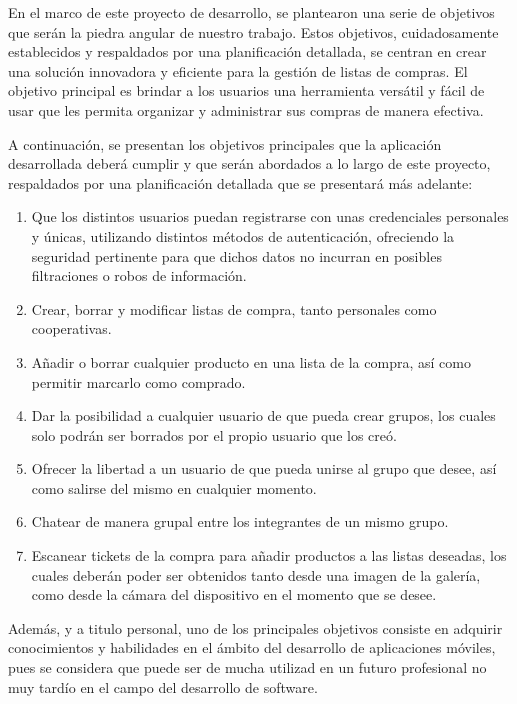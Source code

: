 \documentclass{article}
\begin{document}
En el marco de este proyecto de desarrollo, se plantearon una serie de objetivos que serán la piedra angular de nuestro trabajo. Estos objetivos, cuidadosamente establecidos y respaldados por una planificación detallada, se centran en crear una solución innovadora y eficiente para la gestión de listas de compras. El objetivo principal es brindar a los usuarios una herramienta versátil y fácil de usar que les permita organizar y administrar sus compras de manera efectiva.

A continuación, se presentan los objetivos principales que la aplicación desarrollada deberá cumplir y que serán abordados a lo largo de este proyecto, respaldados por una planificación detallada que se presentará más adelante:

\begin{enumerate}
    \item Que los distintos usuarios puedan registrarse con unas credenciales personales y únicas, utilizando distintos métodos de autenticación, ofreciendo la seguridad pertinente para que dichos datos no incurran en posibles filtraciones o robos de información.
    \item Crear, borrar y modificar listas de compra, tanto personales como cooperativas.
    \item Añadir o borrar cualquier producto en una lista de la compra, así como permitir marcarlo como comprado.
    \item Dar la posibilidad a cualquier usuario de que pueda crear grupos, los cuales solo podrán ser borrados por el propio usuario que los creó.
    \item Ofrecer la libertad a un usuario de que pueda unirse al grupo que desee, así como salirse del mismo en cualquier momento.
    \item Chatear de manera grupal entre los integrantes de un mismo grupo.
    \item Escanear tickets de la compra para añadir productos a las listas deseadas, los cuales deberán poder ser obtenidos tanto desde una imagen de la galería, como desde la cámara del dispositivo en el momento que se desee.
\end{enumerate}

Además, y a titulo personal, uno de los principales objetivos consiste en adquirir conocimientos y habilidades en el ámbito del desarrollo de aplicaciones móviles, pues se considera que puede ser de mucha utilizad en un futuro profesional no muy tardío en el campo del desarrollo de software.
\end{document}
